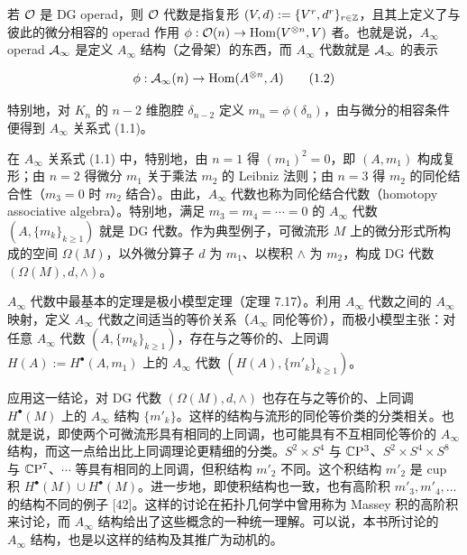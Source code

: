 若 $\mathcal{O}$ 是 DG operad，则 $\mathcal{O}$ 代数是指复形 $(V,d):=\{V^r,d^r\}_{r\in\mathbb{Z}}$，且其上定义了与彼此的微分相容的 operad 作用 $\phi : \mathcal{O}(n)\to\operatorname{Hom}(V^{\otimes n},V)$ 者。也就是说，$A_\infty$ operad $\mathcal{A}_\infty$ 是定义 $A_\infty$ 结构（之骨架）的东西，而 $A_\infty$ 代数就是 $\mathcal{A}_\infty$ 的表示

\begin{equation}
\phi : \mathcal{A}_\infty(n)\to\operatorname{Hom}(A^{\otimes n},A) \tag{1.2}
\end{equation}

特别地，对 $K_n$ 的 $n-2$ 维胞腔 $\delta_{n-2}$ 定义 $m_n=\phi(\delta_n)$，由与微分的相容条件便得到 $A_\infty$ 关系式 (1.1)。


在 $A_\infty$ 关系式 (1.1) 中，特别地，由 $n=1$ 得 $(m_1)^2=0$，即 $(A,m_1)$ 构成复形；由 $n=2$ 得微分 $m_1$ 关于乘法 $m_2$ 的 Leibniz 法则；由 $n=3$ 得 $m_2$ 的同伦结合性（$m_3=0$ 时 $m_2$ 结合）。由此，$A_\infty$ 代数也称为同伦结合代数（homotopy associative algebra）。特别地，满足 $m_3=m_4=\cdots=0$ 的 $A_\infty$ 代数 $(A,\{m_k\}_{k\ge1})$ 就是 DG 代数。作为典型例子，可微流形 $M$ 上的微分形式所构成的空间 $\Omega(M)$，以外微分算子 $d$ 为 $m_1$、以楔积 $\wedge$ 为 $m_2$，构成 DG 代数 $(\Omega(M),d,\wedge)$。

$A_\infty$ 代数中最基本的定理是极小模型定理（定理 7.17）。利用 $A_\infty$ 代数之间的 $A_\infty$ 映射，定义 $A_\infty$ 代数之间适当的等价关系（$A_\infty$ 同伦等价），而极小模型主张：对任意 $A_\infty$ 代数 $(A,\{m_k\}_{k\ge1})$，存在与之等价的、上同调 $H(A):=H^{\bullet}(A,m_1)$ 上的 $A_\infty$ 代数 $(H(A),\{m'_k\}_{k\ge1})$。

应用这一结论，对 DG 代数 $(\Omega(M),d,\wedge)$ 也存在与之等价的、上同调 $H^{\bullet}(M)$ 上的 $A_\infty$ 结构 $\{m'_k\}$。这样的结构与流形的同伦等价类的分类相关。也就是说，即使两个可微流形具有相同的上同调，也可能具有不互相同伦等价的 $A_\infty$ 结构，而这一点给出比上同调理论更精细的分类。$S^2\times S^4$ 与 $\mathbb{C}\mathrm{P}^3$、$S^2\times S^4\times S^8$ 与 $\mathbb{C}\mathrm{P}^7$、$\cdots$ 等具有相同的上同调，但积结构 $m'_2$ 不同。这个积结构 $m'_2$ 是 cup 积 $H^{\bullet}(M)\cup H^{\bullet}(M)$。进一步地，即使积结构也一致，也有高阶积 $m'_3,m'_4,\ldots$ 的结构不同的例子 [42]。这样的讨论在拓扑几何学中曾用称为 Massey 积的高阶积来讨论，而 $A_\infty$ 结构给出了这些概念的一种统一理解。可以说，本书所讨论的 $A_\infty$ 结构，也是以这样的结构及其推广为动机的。

